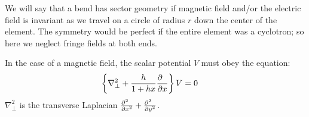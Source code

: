 \documentclass[11pt]{article} %
\begin{document}
We will say that a bend has sector geometry if magnetic field and/or the electric field is invariant as we travel on a circle of radius $r$ down the center of the
element. The symmetry would be perfect if the entire element was a cyclotron; so here we neglect fringe fields at both ends.

In the case of a magnetic field, the scalar potential $V$ must obey the equation:
%
\begin{eqnarray}\left\{{{\nabla }_{\perp }^{2}+{h \over 1+hx}{\partial \hphantom{x} \over \partial x}}\right\}V&=0~\label{eq:maxbv}\end{eqnarray}
%
%
%
%
${\nabla }_{\perp }^{2}$
is the transverse Laplacian %
${{\partial }^{2}\hphantom{x} \over {\partial x}^{2}}+{{\partial }^{2}\hphantom{x} \over {\partial y}^{2}}$.
\end{document}
